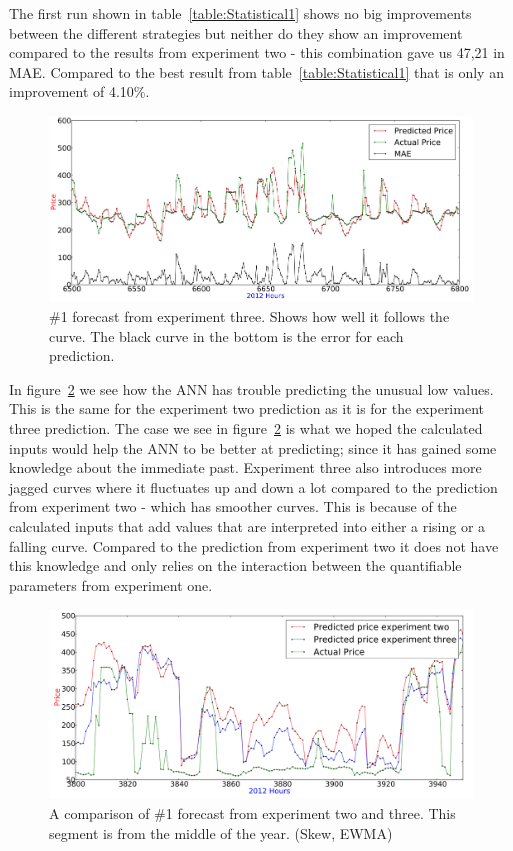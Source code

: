 The first run shown in table~\ref{table:Statistical1} shows no big improvements between the different strategies but neither do they show an improvement compared to the results from experiment two - this combination gave us 47,21 in MAE. Compared to the best result from table~\ref{table:Statistical1} that is only an improvement of 4.10\%.

\begin{figure}[H]
\centering
\includegraphics[width=\linewidth]{billeder/PriceExperimentalAnalysis/X3_Nr1_Best_skew_historical.png}
\caption{\#1 forecast from experiment three. Shows how well it follows the curve. The black curve in the bottom is the error for each prediction.}
\label{fig:X3_Best_With_MAE}
\end{figure}

In figure~\ref{fig:X2_X3_3800_4000} we see how the ANN has trouble predicting the unusual low values. This is the same for the experiment two prediction as it is for the experiment three prediction. The case we see in figure~\ref{fig:X2_X3_3800_4000} is what we hoped the calculated inputs would help the ANN to be better at predicting; since it has gained some knowledge about the immediate past. Experiment three also introduces more jagged curves where it fluctuates up and down a lot compared to the prediction from experiment two - which has smoother curves. This is because of the calculated inputs that add values that are interpreted into either a rising or a falling curve. Compared to the prediction from experiment two it does not have this knowledge and only relies on the interaction between the quantifiable parameters from experiment one.

\begin{figure}[H]
\centering
\includegraphics[width=\linewidth]{billeder/PriceExperimentalAnalysis/X2_X3_3800_4000.png}
\caption{A comparison of \#1 forecast from experiment two and three. This segment is from the middle of the year. (Skew, EWMA)}
\label{fig:X2_X3_3800_4000}
\end{figure}

